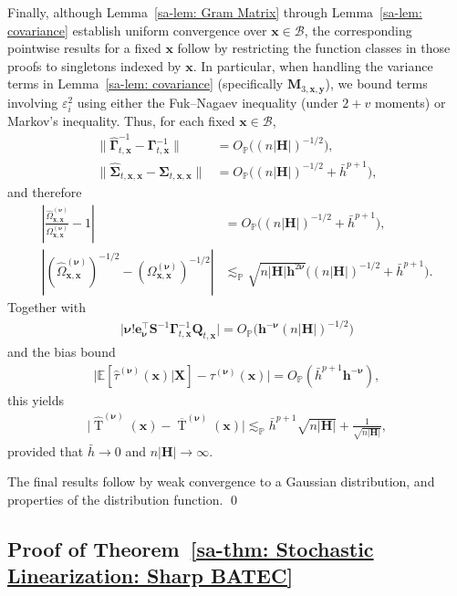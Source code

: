 \documentclass[10pt]{article}
\DeclareMathOperator{\Tstat}{T}
\renewcommand{\P}{\mathbb{P}}
\newcommand{\E}{\mathbb{E}}
\newcommand{\lessp}{\lesssim_{\mathbb{P}}}
\newcommand{\be}{\mathbf{e}}
\newcommand{\bh}{\mathbf{h}}
\newcommand{\bH}{\mathbf{H}}
\newcommand{\bM}{\mathbf{M}}
\newcommand{\bQ}{\mathbf{Q}}
\newcommand{\bS}{\mathbf{S}}
\newcommand{\bx}{\mathbf{x}}
\newcommand{\bX}{\mathbf{X}}
\newcommand{\by}{\mathbf{y}}
\newcommand{\bnu}{\boldsymbol{\nu}}
\newcommand{\bGamma}{\boldsymbol{\Gamma}}
\newcommand{\bSigma}{\boldsymbol{\Sigma}}
\newcommand{\B}{\mathcal{B}}
\begin{document}
Finally, although Lemma~\ref{sa-lem: Gram Matrix} through Lemma~\ref{sa-lem: covariance} establish uniform convergence over $\bx \in \B$, the corresponding pointwise results for a fixed $\bx$ follow by restricting the function classes in those proofs to singletons indexed by $\bx$. In particular, when handling the variance terms in Lemma~\ref{sa-lem: covariance} (specifically $\bM_{3,\bx,\by}$), we bound terms involving $\varepsilon_i^2$ using either the Fuk--Nagaev inequality (under $2+v$ moments) or Markov's inequality. Thus, for each fixed $\bx\in\B$,
\begin{align*}
    \|\widehat{\bGamma}_{t,\bx}^{-1}-\bGamma_{t,\bx}^{-1}\|
    &=O_{\P}\big((n|\bH|)^{-1/2}\big),\\
    \|\widehat{\bSigma}_{t,\bx,\bx}-\bSigma_{t,\bx,\bx}\|
    &=O_{\P}\big((n|\bH|)^{-1/2}+\bar h^{p+1}\big),
\end{align*}
and therefore
\begin{align*}
    \left|\frac{\widehat{\Omega}_{\bx,\bx}^{(\bnu)}}{\Omega_{\bx,\bx}^{(\bnu)}}-1\right|
    &=O_{\P}\big((n|\bH|)^{-1/2}+\bar h^{p+1}\big),\\
    \left|(\widehat{\Omega}_{\bx,\bx}^{(\bnu)})^{-1/2}
          -(\Omega_{\bx,\bx}^{(\bnu)})^{-1/2}\right|
    &\lessp \sqrt{n|\bH|\bh^{2\bnu}}
      \big((n|\bH|)^{-1/2}+\bar h^{p+1}\big).
\end{align*}
Together with
\begin{align*}
    \big|\bnu!\be_{\bnu}^{\top}\bS^{-1}\bGamma_{t,\bx}^{-1}\bQ_{t,\bx}\big|
    =O_{\P}\big(\bh^{-\bnu}(n|\bH|)^{-1/2}\big)
\end{align*}
and the bias bound
\begin{align*}
    \big|\E[\widehat{\tau}^{(\bnu)}(\bx)|\bX]-\tau^{(\bnu)}(\bx)\big|
    =O_{\P}(\bar h^{p+1}\bh^{-\bnu}),
\end{align*}
this yields
\begin{align}\label{sa-eq: lin error 2d}
\Big|\widehat{\Tstat}^{(\bnu)}(\bx) - \overline{\Tstat}^{(\bnu)}(\bx)\Big|
\lessp
\bar{h}^{p+1}\sqrt{n |\bH|} + \frac{1}{\sqrt{n |\bH|}},
\end{align}
provided that $\bar{h} \to 0$ and $n |\bH| \to \infty$.

The final results follow by weak convergence to a Gaussian distribution, and properties of the distribution function.
\qed

\subsection{Proof of Theorem~\ref{sa-thm: Stochastic Linearization: Sharp BATEC}}
\end{document}
